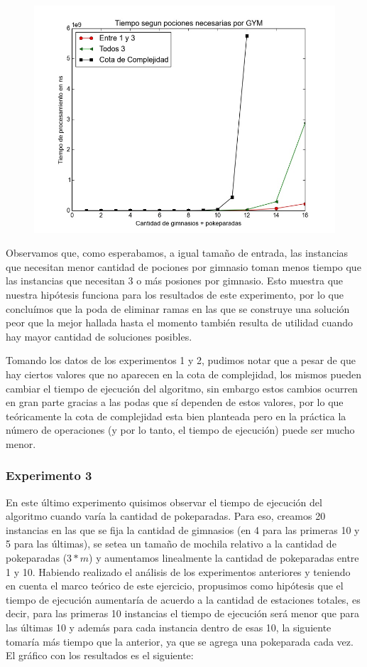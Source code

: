   \begin{figure}[H]
      \begin{center}
        \includegraphics[width=0.7\columnwidth]{imagenes/exp2_ej1.jpeg}
        \caption{}
      \end{center}
  \end{figure}

      Observamos que, como esperabamos, a igual tamaño de entrada, las instancias que necesitan menor cantidad de pociones por gimnasio toman menos tiempo que las instancias que necesitan 3 o más posiones por gimnasio. Esto muestra que nuestra hipótesis funciona para los resultados de este experimento, por lo que concluímos que la poda de eliminar ramas en las que se construye una solución peor que la mejor hallada hasta el momento también resulta de utilidad cuando hay mayor cantidad de soluciones posibles. 

      Tomando los datos de los experimentos 1 y 2, pudimos notar que a pesar de que hay ciertos valores que no aparecen en la cota de complejidad, los mismos pueden cambiar el tiempo de ejecución del algoritmo, sin embargo estos cambios ocurren en gran parte gracias a las podas que sí dependen de estos valores, por lo que teóricamente la cota de complejidad esta bien planteada pero en la práctica la número de operaciones (y por lo tanto, el tiempo de ejecución) puede ser mucho menor.

    \subsubsection{Experimento 3}

      En este último experimento quisimos observar el tiempo de ejecución del algoritmo cuando varía la cantidad de pokeparadas. Para eso, creamos 20 instancias en las que se fija la cantidad de gimnasios (en 4 para las primeras 10 y 5 para las últimas), se setea un tamaño de mochila relativo a la cantidad de pokeparadas ($3*m$) y aumentamos linealmente la cantidad de pokeparadas entre 1 y 10.
      Habiendo realizado el análisis de los experimentos anteriores y teniendo en cuenta el marco teórico de este ejercicio, propusimos como hipótesis que el tiempo de ejecución aumentaría de acuerdo a la cantidad de estaciones totales, es decir, para las primeras 10 instancias el tiempo de ejecución será menor que para las últimas 10 y además para cada instancia dentro de esas 10, la siguiente tomaría más tiempo que la anterior, ya que se agrega una pokeparada cada vez.
      El gráfico con los resultados es el siguiente:

